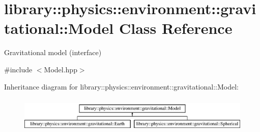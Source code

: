\hypertarget{classlibrary_1_1physics_1_1environment_1_1gravitational_1_1_model}{}\section{library\+:\+:physics\+:\+:environment\+:\+:gravitational\+:\+:Model Class Reference}
\label{classlibrary_1_1physics_1_1environment_1_1gravitational_1_1_model}


Gravitational model (interface)  




{\ttfamily \#include $<$Model.\+hpp$>$}

Inheritance diagram for library\+:\+:physics\+:\+:environment\+:\+:gravitational\+:\+:Model\+:\begin{figure}[H]
\begin{center}
\leavevmode
\includegraphics[height=1.772152cm]{classlibrary_1_1physics_1_1environment_1_1gravitational_1_1_model}
\end{center}
\end{figure}

